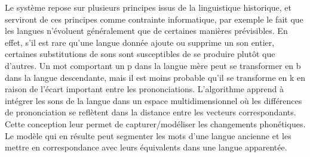 \documentclass[12pt, french, twoside]{report}
\begin{document}
Le système repose sur plusieurs principes issus de la linguistique historique, et serviront de ces principes comme contrainte informatique, par exemple le fait que les langues n'évoluent généralement que de certaines manières prévisibles. En effet, s'il est rare qu'une langue donnée ajoute ou supprime un son entier, certaines substitutions de sons sont susceptibles de se produire plutôt que d'autres. Un mot comportant un \og p\fg{} dans la langue mère peut se transformer en \og b\fg{} dans la langue descendante, mais il est moins probable qu'il se transforme en \og k\fg{} en raison de l'écart important entre les prononciations. L'algorithme apprend à intégrer les sons de la langue dans un espace multidimensionnel où les différences de prononciation se reflètent dans la distance entre les vecteurs correspondants. Cette conception leur permet de capturer/modéliser les changements phonétiques. Le modèle qui en résulte peut segmenter les mots d'une langue ancienne et les mettre en correspondance avec leurs équivalents dans une langue apparentée.\\ 

\end{document}
